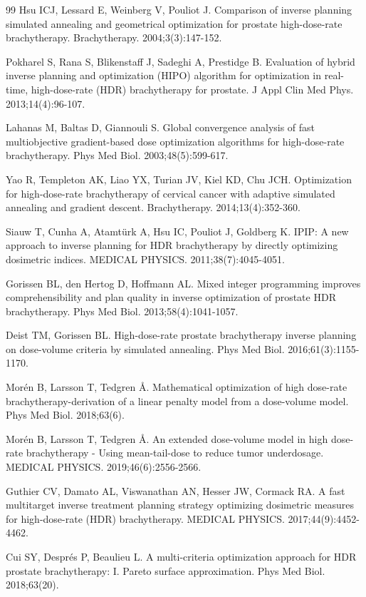 \documentclass[12pt,twoside,letterpaper]{article}
\newcounter{algorithm}
\begin{document}
\begin{thebibliography}{99}
 Hsu ICJ, Lessard E, Weinberg V, Pouliot J. Comparison of inverse planning simulated annealing and geometrical optimization for prostate high-dose-rate brachytherapy. Brachytherapy. 2004;3(3):147-152.

 Pokharel S, Rana S, Blikenstaff J, Sadeghi A, Prestidge B. Evaluation of hybrid inverse planning and optimization (HIPO) algorithm for optimization in real-time, high-dose-rate (HDR) brachytherapy for prostate. J Appl Clin Med Phys. 2013;14(4):96-107.

 Lahanas M, Baltas D, Giannouli S. Global convergence analysis of fast multiobjective gradient-based dose optimization algorithms for high-dose-rate brachytherapy. Phys Med Biol. 2003;48(5):599-617.

 Yao R, Templeton AK, Liao YX, Turian JV, Kiel KD, Chu JCH. Optimization for high-dose-rate brachytherapy of cervical cancer with adaptive simulated annealing and gradient descent. Brachytherapy. 2014;13(4):352-360.

 Siauw T, Cunha A, Atamtürk A, Hsu IC, Pouliot J, Goldberg K. IPIP: A new approach to inverse planning for HDR brachytherapy by directly optimizing dosimetric indices. MEDICAL PHYSICS. 2011;38(7):4045-4051.

 Gorissen BL, den Hertog D, Hoffmann AL. Mixed integer programming improves comprehensibility and plan quality in inverse optimization of prostate HDR brachytherapy. Phys Med Biol. 2013;58(4):1041-1057.

 Deist TM, Gorissen BL. High-dose-rate prostate brachytherapy inverse planning on dose-volume criteria by simulated annealing. Phys Med Biol. 2016;61(3):1155-1170.

 Morén B, Larsson T, Tedgren Å. Mathematical optimization of high dose-rate brachytherapy-derivation of a linear penalty model from a dose-volume model. Phys Med Biol. 2018;63(6).

 Morén B, Larsson T, Tedgren Å. An extended dose-volume model in high dose-rate brachytherapy - Using mean-tail-dose to reduce tumor underdosage. MEDICAL PHYSICS. 2019;46(6):2556-2566.

 Guthier CV, Damato AL, Viswanathan AN, Hesser JW, Cormack RA. A fast multitarget inverse treatment planning strategy optimizing dosimetric measures for high-dose-rate (HDR) brachytherapy. MEDICAL PHYSICS. 2017;44(9):4452-4462.

 Cui SY, Després P, Beaulieu L. A multi-criteria optimization approach for HDR prostate brachytherapy: I. Pareto surface approximation. Phys Med Biol. 2018;63(20).


\end{thebibliography}
\end{document}
